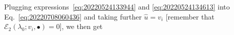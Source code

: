 \documentclass[12pt, final]{scrartcl}
\theoremstyle{definition}
\newcommand{\E}{\mathcal E}
\newcommand{\order}[2][1]{#2^{(#1)}}
\begin{document}
Plugging expressions~\eqref{eq:20220524133944} and \eqref{eq:20220524134613}
into Eq.~\eqref{eq:20220708060436} and taking further $\hat{u} = v_i$
[remember that $\E_2(\lambda_0; v_i, \bullet) = 0$], we then get
\end{document}

